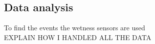 \subsection{Data analysis}
\label{sec:analyzing_data}
To find the events the wetness sensors are used \\
EXPLAIN HOW I HANDLED ALL THE DATA






































